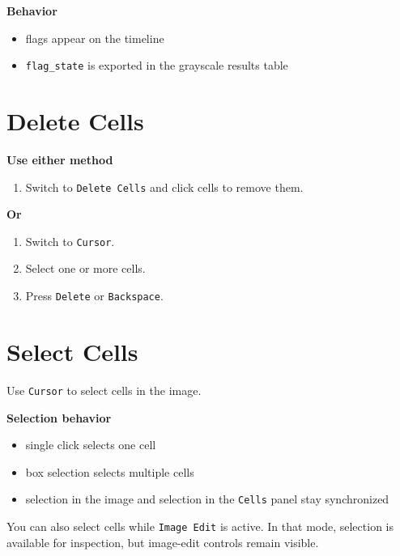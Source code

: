 \documentclass[
  9pt,
  letterpaper,
  oneside,
  open=any,
  DIV=15,
  parskip=half-,
  headings=big,
  numbers=noenddot
]{scrbook}
\newcommand{\manuallead}[1]{%
  \vspace{0.15em}%
  {\sffamily\bfseries\color{ManualBlue}#1}\par\nobreak\vspace{0.05em}%
}
\begin{document}
\manuallead{Behavior}

\begin{itemize}[leftmargin=*,itemsep=0.35em,topsep=0.4em]
\item flags appear on the timeline
\item \texttt{flag\_state} is exported in the grayscale results table
\end{itemize}

\section{Delete Cells}

\manuallead{Use either method}

\begin{enumerate}[leftmargin=*,itemsep=0.35em,topsep=0.4em]
\item Switch to \texttt{Delete Cells} and click cells to remove them.
\end{enumerate}

\manuallead{Or}

\begin{enumerate}[leftmargin=*,itemsep=0.35em,topsep=0.4em]
\item Switch to \texttt{Cursor}.
\item Select one or more cells.
\item Press \texttt{Delete} or \texttt{Backspace}.
\end{enumerate}

\section{Select Cells}

Use \texttt{Cursor} to select cells in the image.


\manuallead{Selection behavior}

\begin{itemize}[leftmargin=*,itemsep=0.35em,topsep=0.4em]
\item single click selects one cell
\item box selection selects multiple cells
\item selection in the image and selection in the \texttt{Cells} panel stay synchronized
\end{itemize}

You can also select cells while \texttt{Image Edit} is active. In that mode, selection is available for inspection, but image-edit controls remain visible.
\end{document}
